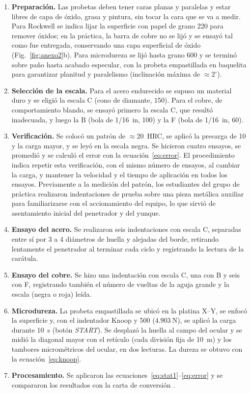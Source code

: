 \documentclass[journal,11pt]{IEEEtran}
\begin{document}
\begin{enumerate}
\item \textbf{Preparación.} Las probetas deben tener caras planas y paralelas y estar libres de capa de óxido, grasa y pintura, sin tocar la cara que se va a medir. Para Rockwell se indica lijar la superficie con papel de grano 220 para remover óxidos; en la práctica, la barra de cobre no se lijó y se ensayó tal como fue entregada, conservando una capa superficial de óxido (Fig.~\ref{fig:anexo2}b). Para microdureza se lijó hasta grano 600 y se terminó sobre paño hasta acabado especular, con la probeta empastillada en baquelita para garantizar planitud y paralelismo (inclinación máxima de $\approx2^{\circ}$).
\item \textbf{Selección de la escala.} Para el acero endurecido se supuso un material duro y se eligió la escala C (cono de diamante, \SI{150}{\kgf}). Para el cobre, de comportamiento blando, se ensayó primero la escala C, que resultó inadecuada, y luego la B (bola de 1/16~in, \SI{100}{\kgf}) y la F (bola de 1/16~in, \SI{60}{\kgf}).
\item \textbf{Verificación.} Se colocó un patrón de $\approx$20~HRC, se aplicó la precarga de \SI{10}{\kgf} y la carga mayor, y se leyó en la escala negra. Se hicieron cuatro ensayos, se promedió y se calculó el error con la ecuación~\eqref{eq:error}. El procedimiento indica repetir esta verificación, con el mismo número de ensayos, al cambiar la carga, y mantener la velocidad y el tiempo de aplicación en todos los ensayos. Previamente a la medición del patrón, los estudiantes del grupo de práctica realizaron indentaciones de prueba sobre una pieza metálica auxiliar para familiarizarse con el accionamiento del equipo, lo que sirvió de asentamiento inicial del penetrador y del yunque.
\item \textbf{Ensayo del acero.} Se realizaron seis indentaciones con escala C, separadas entre sí por 3 a 4 diámetros de huella y alejadas del borde, retirando lentamente el penetrador al terminar cada ciclo y registrando la lectura de la carátula.
\item \textbf{Ensayo del cobre.} Se hizo una indentación con escala C, una con B y seis con F, registrando también el número de vueltas de la aguja grande y la escala (negra o roja) leída.
\item \textbf{Microdureza.} La probeta empastillada se ubicó en la platina X--Y, se enfocó la superficie y, con el indentador Knoop y \SI{500}{\gf} ($\SI{4,903}{\newton}$), se aplicó la carga durante \SI{10}{\second} (botón \textit{START}). Se desplazó la huella al campo del ocular y se midió la diagonal mayor con el retículo (cada división fija de 10~\textmu m) y los tambores micrométricos del ocular, en dos lecturas. La dureza se obtuvo con la ecuación~\eqref{eq:knoop}.
\item \textbf{Procesamiento.} Se aplicaron las ecuaciones~\eqref{eq:stat1}--\eqref{eq:error} y se compararon los resultados con la carta de conversión \cite{leco}.
\end{enumerate}
\end{document}
